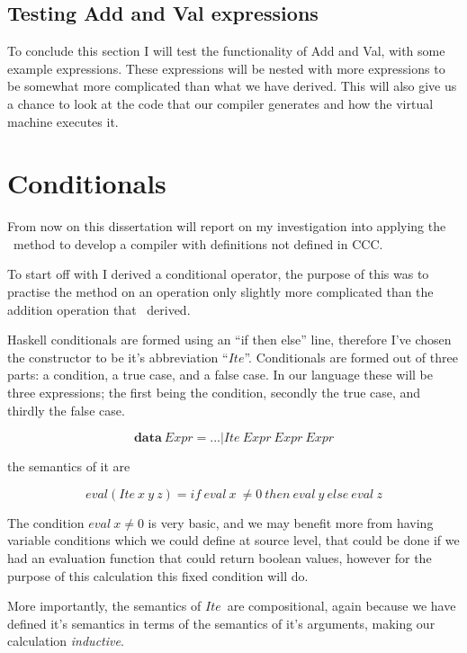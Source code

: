 \documentclass {article}
\begin{document}
\subsection{Testing Add and Val expressions}

To conclude this section I will test the functionality
of Add and Val, with some example expressions.
These expressions will be nested with more expressions
to be somewhat more complicated than what we have derived.
This will also give us a chance to look at the code that our
compiler generates and how the virtual machine executes it.


\section{Conditionals}

From now on this dissertation will report on my
investigation into applying the \BH\ method to develop a compiler
with definitions not defined in CCC.

To start off with I derived a conditional operator,
the purpose of this was to practise the method
on an operation only slightly more complicated than
the addition operation that \BH\ derived.

\newcommand{\ite}{$Ite$}

Haskell conditionals are formed 
using an ``if then else'' line,
therefore I've chosen the constructor to be 
it's abbreviation ``\ite''.
Conditionals are formed out of three parts:
a condition, a true case, and a false case.
In our language these will be three expressions;
the first being the condition, secondly the true case,
and thirdly the false case.

	\[ \textbf{data} \ Expr = ... | Ite \ Expr \ Expr \ Expr \]

the semantics of it are

	\[eval(Ite \ x \ y \ z) = if \ eval \ x \ \not= 0 \ then \ eval \ y \ else \ eval \ z \]

The condition $eval \ x  \not= 0$ is very basic,
and we may benefit more from having variable conditions
which we could define at source level,
that could be done if we had an evaluation function 
that could return boolean values, 
however for the purpose of this calculation
this fixed condition will do.

More importantly, the semantics of \ite\
are compositional, 
again because we have defined it's
semantics in terms of the semantics of 
it's arguments, 
making our calculation \emph{inductive}.
\end{document}
